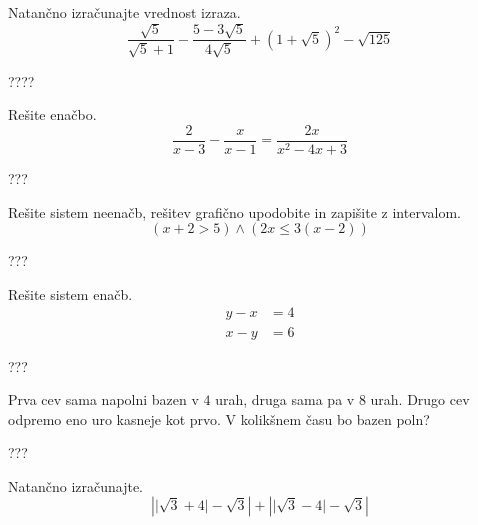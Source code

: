 \documentclass[addpoints]{exam}
\begin{document}
\begin{questions}


    \question[6]
    Natančno izračunajte vrednost izraza.
    $$ \dfrac{\sqrt{5}}{\sqrt{5}+1}-\dfrac{5-3\sqrt{5}}{4\sqrt{5}}+\left(1+\sqrt{5}\right)^2-\sqrt{125} $$

    \begin{solution}[6cm]
        ????
    \end{solution}
    
    
    \newpage

    \question[4]
    Rešite enačbo.
    $$ \dfrac{2}{x-3}-\dfrac{x}{x-1}=\dfrac{2x}{x^2-4x+3} $$
    
    
    \begin{solution}[9cm]
        ???
    \end{solution}

        


    \question[5]
    Rešite sistem neenačb, rešitev grafično upodobite in zapišite z intervalom.
    $$ \left(x+2>5\right)\land\left(2x\leq 3(x-2)\right) $$
    
    
    \begin{solution}[8cm]
        ???
    \end{solution}


    \newpage 


    \question[4]
    Rešite sistem enačb.
    $$ \begin{aligned}
        y-x&=4 \\ x-y&=6
    \end{aligned} $$
    
    
    \begin{solution}[9cm]
        ???
    \end{solution}



    \question[4]
    Prva cev sama napolni bazen v $4$ urah, druga sama pa v $8$ urah. Drugo cev odpremo eno uro kasneje kot prvo.
    V kolikšnem času bo bazen poln?
    
    
    \begin{solution}[8cm]
        ???
    \end{solution}




    \newpage 

    
    \question[4]
    Natančno izračunajte.
    $$ \left\lvert \lvert\sqrt{3}+4\rvert-\sqrt{3}\right\rvert + \left\lvert \lvert\sqrt{3}-4\rvert-\sqrt{3}\right\rvert $$
    

\end{questions}
\end{document}
